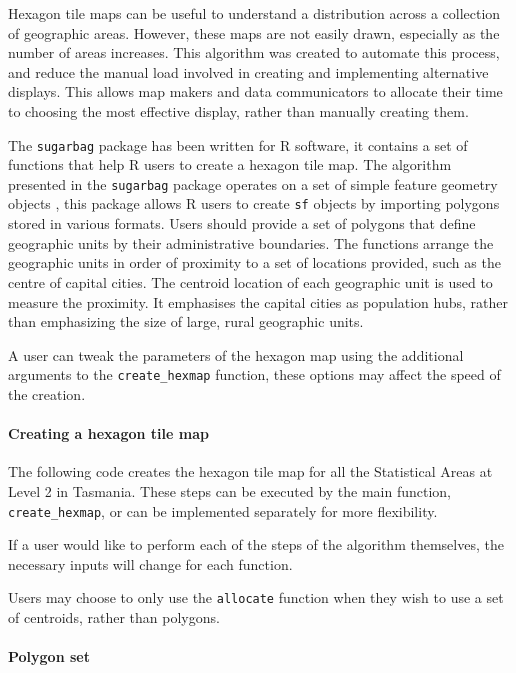 Hexagon tile maps can be useful to understand a distribution across a
collection of geographic areas. However, these maps are not easily
drawn, especially as the number of areas increases. This algorithm was
created to automate this process, and reduce the manual load involved in
creating and implementing alternative displays. This allows map makers
and data communicators to allocate their time to choosing the most
effective display, rather than manually creating them.

The \texttt{sugarbag} package has been written for R software, it
contains a set of functions that help R users to create a hexagon tile
map. The algorithm presented in the \texttt{sugarbag} package operates
on a set of simple feature geometry objects \citep{sf}, this package
allows R users to create \texttt{sf} objects by importing polygons
stored in various formats. Users should provide a set of polygons that
define geographic units by their administrative boundaries. The
functions arrange the geographic units in order of proximity to a set of
locations provided, such as the centre of capital cities. The centroid
location of each geographic unit is used to measure the proximity. It
emphasises the capital cities as population hubs, rather than
emphasizing the size of large, rural geographic units.

A user can tweak the parameters of the hexagon map using the additional
arguments to the \texttt{create\_hexmap} function, these options may
affect the speed of the creation.

\hypertarget{creating-a-hexagon-tile-map}{%
\paragraph{Creating a hexagon tile
map}\label{creating-a-hexagon-tile-map}}

The following code creates the hexagon tile map for all the Statistical
Areas at Level 2 in Tasmania. These steps can be executed by the main
function, \texttt{create\_hexmap}, or can be implemented separately for
more flexibility.

If a user would like to perform each of the steps of the algorithm
themselves, the necessary inputs will change for each function.

Users may choose to only use the \texttt{allocate} function when they
wish to use a set of centroids, rather than \citep{sf} polygons.

\hypertarget{polygon-set}{%
\paragraph{Polygon set}\label{polygon-set}}

